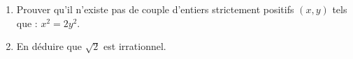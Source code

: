\begin{enumerate}
  \item Prouver qu'il n'existe pas de couple d'entiers strictement positifs
  $(x, y)$ tels que : $x^2 = 2y^2$.
  \item En déduire que $\sqrt{2}$ est irrationnel.
\end{enumerate}
